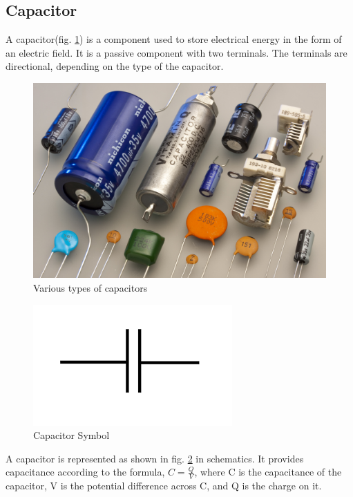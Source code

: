 \documentclass{article}
\begin{document}
\subsection{Capacitor}
A capacitor(fig. \ref{fig:capacitors}) is a component used to store electrical energy in the form of an electric field. It is a passive component with two terminals. The terminals are directional, depending on the type of the capacitor. \\
\begin{figure}[h]
	\centering
	\includegraphics[width=0.7\linewidth]{Capacitors}
	\caption[Various types of capacitors]{Various types of capacitors}
	\label{fig:capacitors}
\end{figure}
\begin{figure}[h]
	\centering
	\includegraphics[width=0.1\linewidth]{capacitor_symbol}
	\caption{Capacitor Symbol}
	\label{fig:capacitorsymbol}
\end{figure}
A capacitor is represented as shown in fig. \ref{fig:capacitorsymbol} in schematics. It provides capacitance according to the formula, $ C = \frac{Q}{V} $, where C is the capacitance of the capacitor, V is the potential difference across C, and Q is the charge on it.
\end{document}
